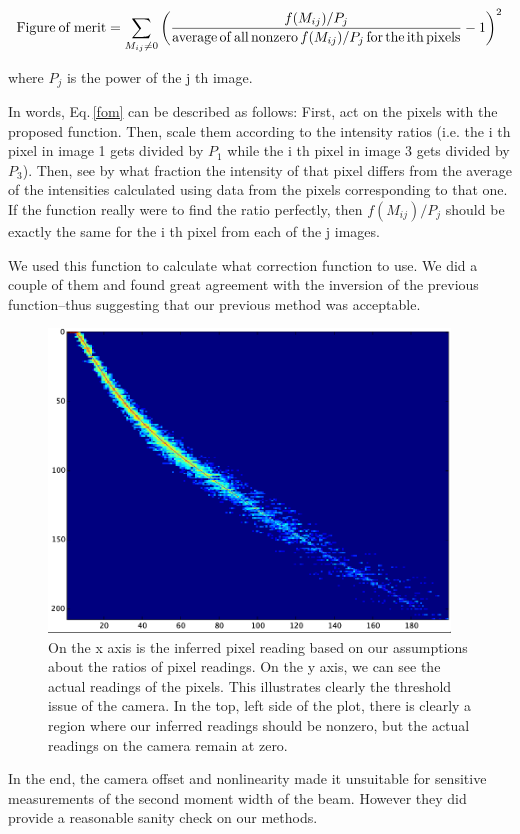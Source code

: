 \begin{equation}\label{fom}
{\rm Figure\:of\:merit}=\sum_{ M_{i j}\neq 0}\left(\frac{f(M_{i j})/P_j}{{\rm average\,of\,all\,nonzero\,} f(M_{i j})/P_j {\rm \,for\,the\,ith\,pixels}}-1\right)^2
\end{equation}

where $P_j$ is the power of the j th image.

In words, Eq.\,\ref{fom} can be described as follows: First, act on the pixels with the proposed function. Then, scale them according to the intensity ratios (i.e. the i th pixel in image 1 gets divided by $P_1$ while the i th pixel in image 3 gets divided by $P_3$). Then, see by what fraction the intensity of that pixel differs from the average of the intensities calculated using data from the pixels corresponding to that one. If the function really were to find the ratio perfectly, then $f(M_{ij})/P_j$ should be exactly the same for the i th pixel from each of the j images. 

We used this function to calculate what correction function to use. We did a couple of them and found great agreement with the inversion of the previous function--thus suggesting that our previous method was acceptable. 

\begin{figure}
\centerline{
\includegraphics[width=0.95\textwidth]{cameraPixelFit}
}
\caption[Camera linearity and offset]{On the x axis is the inferred pixel reading based on our assumptions about the ratios of pixel readings. On the y axis, we can see the actual readings of the pixels. This illustrates clearly the threshold issue of the camera. In the top, left side of the plot, there is clearly a region where our inferred readings should be nonzero, but the actual readings on the camera remain at zero.\label{cameraPixelFit}}
\end{figure}

In the end, the camera offset and nonlinearity made it unsuitable for sensitive measurements of the second moment width of the beam. However they did provide a reasonable sanity check on our methods.
%


